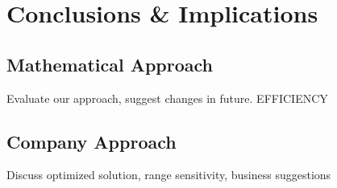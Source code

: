 \documentclass{article}
\begin{document}
\section{Conclusions \& Implications}
\subsection{Mathematical Approach}
Evaluate our approach, suggest changes in future.  EFFICIENCY
\subsection{Company Approach}
Discuss optimized solution, range sensitivity, business suggestions
	\newpage
	\begin{thebibliography}{9}

\end{thebibliography}
\end{document}
